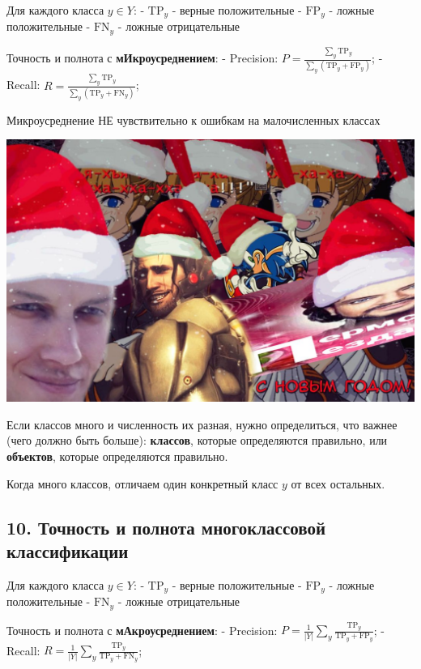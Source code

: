 Для каждого класса $y \in Y$:
- $\text{TP}_y$ - верные положительные
- $\text{FP}_y$ - ложные положительные
- $\text{FN}_y$ - ложные отрицательные

Точность и полнота с \textbf{мИкроусреднением}:
- Precision: $\displaystyle P = \frac{\sum_y{\text{TP}_y}}{\sum_y{(\text{TP}_y + \text{FP}_y)}}$;
- Recall: $\displaystyle R = \frac{\sum_y{\text{TP}_y}}{\sum_y{(\text{TP}_y + \text{FN}_y)}}$;

Микроусреднение НЕ чувствительно к ошибкам на малочисленных классах

\includegraphics[scale=0.3]{figures/samplefigure.jpg}

Если классов много и численность их разная, нужно определиться, что важнее
(чего должно быть больше): \textbf{классов}, которые определяются правильно, или
\textbf{объектов}, которые определяются правильно.

Когда много классов, отличаем один конкретный класс $y$ от всех остальных.

\subsection{10. Точность и полнота многоклассовой классификации}

Для каждого класса $y \in Y$:
- $\text{TP}_y$ - верные положительные
- $\text{FP}_y$ - ложные положительные
- $\text{FN}_y$ - ложные отрицательные

Точность и полнота с \textbf{мАкроусреднением}:
- Precision: $\displaystyle P = \frac{1}{\vert Y \vert} \sum_{y}{\frac{\text{TP}_y}{\text{TP}_y + \text{FP}_y}}$;
- Recall: $\displaystyle R = \frac{1}{\vert Y \vert} \sum_{y}{\frac{\text{TP}_y}{\text{TP}_y + \text{FN}_y}}$;

